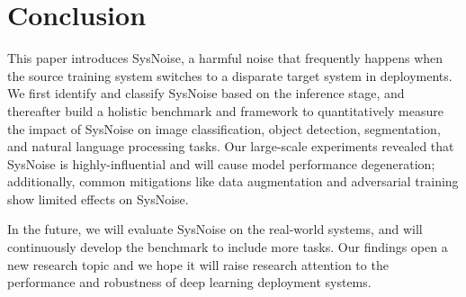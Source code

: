 \section{Conclusion}
This paper introduces SysNoise, a harmful noise that frequently happens when the source training system switches to a disparate target system in deployments. We first identify and classify SysNoise based on the inference stage, and thereafter build a holistic benchmark and framework to quantitatively measure the impact of SysNoise on image classification, object detection, segmentation, and natural language processing tasks. Our large-scale experiments revealed that SysNoise is highly-influential and will cause model performance degeneration; additionally, common mitigations like data augmentation and adversarial training show limited effects on SysNoise.  

In the future, we will evaluate SysNoise on the real-world systems, and will continuously develop the benchmark to include more tasks. Our findings open a new research topic and we hope it will raise research attention to the performance and robustness of deep learning deployment systems. 

